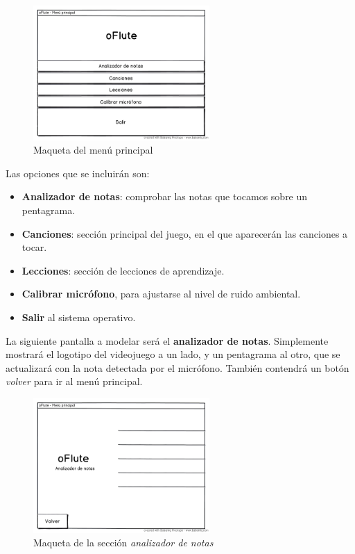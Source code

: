 \begin{figure}[h!]
  \centering
  \includegraphics[width=0.6\textwidth]{desarrollo/mockup_menu_principal}
  \caption{Maqueta del menú principal}
\end{figure}

\pagebreak

Las opciones que se incluirán son:
\begin{itemize}
\item \textbf{Analizador de notas}: comprobar las notas que tocamos sobre un
  pentagrama.
\item \textbf{Canciones}: sección principal del juego, en el que aparecerán las
  canciones a tocar.
\item \textbf{Lecciones}: sección de lecciones de aprendizaje.
\item \textbf{Calibrar micrófono}, para ajustarse al nivel de ruido ambiental.
\item \textbf{Salir} al sistema operativo.
\end{itemize}

La siguiente pantalla a modelar será el \textbf{analizador de
  notas}. Simplemente mostrará el logotipo del videojuego a un lado, y un
pentagrama al otro, que se actualizará con la nota detectada por el
micrófono. También contendrá un botón \textit{volver} para ir al menú principal.

\begin{figure}[h!]
  \centering
  \includegraphics[width=0.6\textwidth]{desarrollo/mockup_analizador}
  \caption{Maqueta de la sección \textit{analizador de notas}}
\end{figure}

